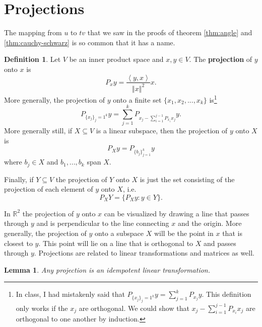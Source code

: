 \documentclass[12pt,reqno]{amsart}
\newtheorem{lemma}{Lemma}[section]
\theoremstyle{definition}
\newtheorem{definition}{Definition}[section]
\def\R{\mathbb{R}}
\newcommand{\iprod}[2]{\left\langle {#1} , {#2} \right\rangle}
\newcommand{\norm}[1]{\left\Vert {#1} \right\Vert}
\begin{document}
\section{Projections}
The mapping from $u$ to $tv$ that we saw in the proofs of theorem
\ref{thm:angle} and \ref{thm:cauchy-schwarz} is so common that it has
a name.
\begin{definition}
  Let $V$ be an inner product space and $x,y \in V$. The
  \textbf{projection} of $y$ onto $x$ is 
  \[ P_x y = \frac{\iprod{y}{x}}{\norm{x}^2} x. \]
  More generally, the projection of $y$ onto a finite set $\{x_1, x_2,
  ... , x_k\}$ is\footnote{In class, I had mistakenly said that
    $P_{\{x_j\}_j=1^k} y = \sum_{j=1}^k P_{x_j} y$. This definition
    only works if the $x_j$ are orthogonal. We could show that $x_j
    -\sum_{i=1}^{j-1} P_{x_i} x_j$ are orthogonal to one another by
    induction.}
  \[ P_{\{x_j\}_j=1^k} y = \sum_{j=1}^k P_{x_j - \sum_{i=1}^{j-1}
    P_{x_i} x_j} y. \]
  More generally still, if $X \subseteq V$ is a linear subspace, then
  the projection of $y$ onto $X$ is
  \[ P_{X} y = P_{\{b_j\}_{j=1}^k} y \]
  where $b_j \in X$ and $b_1, ..., b_k$ span $X$. 
  
  Finally, if $Y \subseteq V$ the projection of $Y$ onto $X$ is just
  the set consisting of the projection of each element of $y$ onto
  $X$, i.e.
  \[ P_{X} Y = \{ P_{X} y : y \in Y \}. \]
\end{definition}
In $\R^2$ the projection of $y$ onto $x$ can be visualized by drawing
a line that passes through $y$ and is perpendicular to the line
connecting $x$ and the origin. More generally, the projection of $y$
onto a subspace $X$ will be the point in $x$ that is closest to
$y$. This point will lie on a line that is orthogonal to $X$ and
passes through $y$. Projections are related to linear transformations
and matrices as well.
\begin{lemma}
  Any projection is an idempotent linear transformation. 
\end{lemma}
\end{document}
